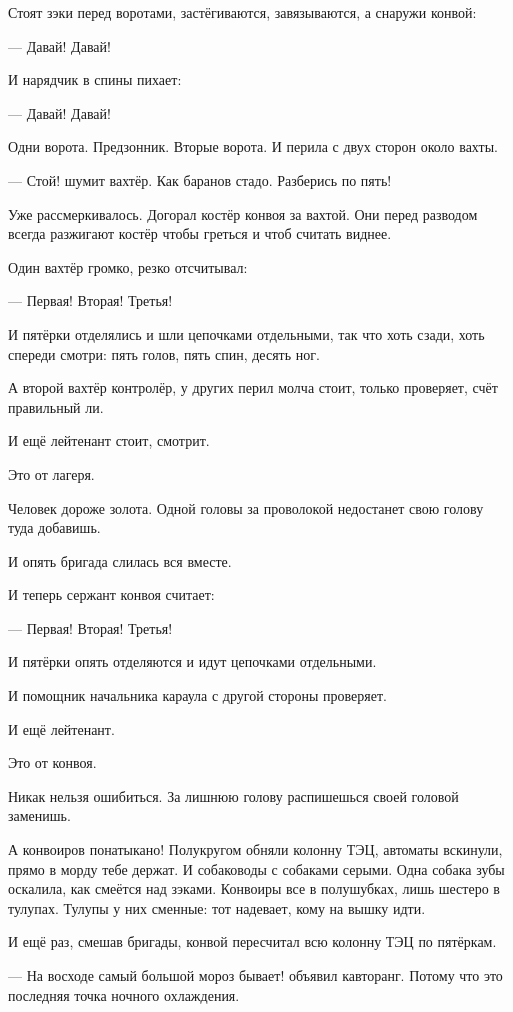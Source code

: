 Стоят зэки перед воротами, застёгиваются, завязываются, а снаружи конвой:

--- Давай! Давай!

И нарядчик в спины пихает:

--- Давай! Давай!

Одни ворота. Предзонник. Вторые ворота. И перила с двух сторон около вахты.

--- Стой! \dash шумит вахтёр. \Dash Как баранов стадо. Разберись по пять!

Уже рассмеркивалось. Догорал костёр конвоя за вахтой. Они перед разводом всегда разжигают
костёр \dash чтобы греться и чтоб считать виднее.

Один вахтёр громко, резко отсчитывал:

--- Первая! Вторая! Третья!

И пятёрки отделялись и шли цепочками отдельными, так что хоть сзади, хоть спереди смотри:
пять голов, пять спин, десять ног.

А второй вахтёр \dash контролёр, у других перил молча стоит, только проверяет, счёт правильный
ли.

И ещё лейтенант стоит, смотрит.

Это от лагеря.

Человек \dash дороже золота. Одной головы за проволокой недостанет \dash свою голову туда добавишь.

И опять бригада слилась вся вместе.

И теперь сержант конвоя считает:

--- Первая! Вторая! Третья!

И пятёрки опять отделяются и идут цепочками отдельными.

И помощник начальника караула с другой стороны проверяет.

И ещё лейтенант.

Это от конвоя.

Никак нельзя ошибиться. За лишнюю голову распишешься \dash своей головой заменишь.

А конвоиров понатыкано! Полукругом обняли колонну ТЭЦ, автоматы вскинули, прямо в морду тебе
держат. И собаководы с собаками серыми. Одна собака зубы оскалила, как смеётся над зэками.
Конвоиры все в полушубках, лишь шестеро в тулупах. Тулупы у них сменные: тот надевает, кому на
вышку идти.

И ещё раз, смешав бригады, конвой пересчитал всю колонну ТЭЦ по пятёркам.

--- На восходе самый большой мороз бывает! \dash объявил кавторанг. \Dash Потому что это последняя
точка ночного охлаждения.

